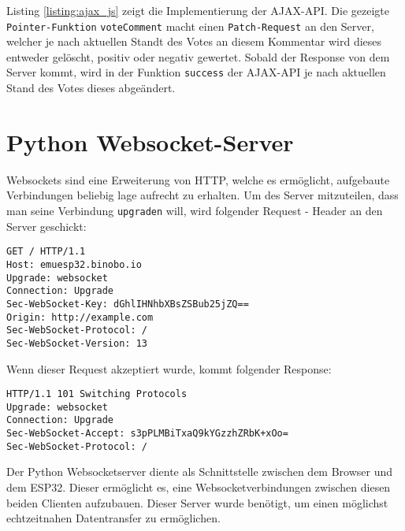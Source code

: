 \documentclass[paper=a4,12pt]{scrreprt}
\begin{document}
Listing \ref{listing:ajax_js} zeigt die Implementierung der AJAX-API.\newline
Die gezeigte \texttt{Pointer-Funktion} \texttt{voteComment} macht einen \texttt{Patch-Request} an den Server, welcher je nach aktuellen Standt des Votes an diesem Kommentar wird dieses
entweder gelöscht, positiv oder negativ gewertet. Sobald der Response von dem Server kommt, wird in der Funktion \texttt{success} der AJAX-API je nach aktuellen Stand des Votes dieses abgeändert.\newline


\chapter{Python Websocket-Server}
\label{chap:py_websocket_server}

Websockets sind eine Erweiterung von HTTP, welche es ermöglicht, aufgebaute Verbindungen beliebig lage aufrecht zu erhalten. Um des Server mitzuteilen, dass man seine Verbindung \texttt{upgraden} will, wird folgender Request - Header an den Server geschickt\cite{ws_protocol}:\newline

\begin{lstlisting}[caption={HTTP-Header für Websocket-Upgrade}, captionpos=b, label={listing:http_upgrade}]
GET / HTTP/1.1
Host: emuesp32.binobo.io
Upgrade: websocket
Connection: Upgrade
Sec-WebSocket-Key: dGhlIHNhbXBsZSBub25jZQ==
Origin: http://example.com
Sec-WebSocket-Protocol: /
Sec-WebSocket-Version: 13
\end{lstlisting}

Wenn dieser Request akzeptiert wurde, kommt folgender Response:\newline

\begin{lstlisting}[caption={Respone um auf Websockets-Protokoll zu wechseln}, captionpos=b, label={listing:http_upgrade_response}]
HTTP/1.1 101 Switching Protocols
Upgrade: websocket
Connection: Upgrade
Sec-WebSocket-Accept: s3pPLMBiTxaQ9kYGzzhZRbK+xOo=
Sec-WebSocket-Protocol: /
\end{lstlisting}

Der Python Websocketserver diente als Schnittstelle zwischen dem Browser und dem ESP32. Dieser ermöglicht es, eine Websocketverbindungen zwischen diesen beiden Clienten aufzubauen.\newline
Dieser Server wurde benötigt, um einen möglichst echtzeitnahen Datentransfer zu ermöglichen.\newline
\end{document}
